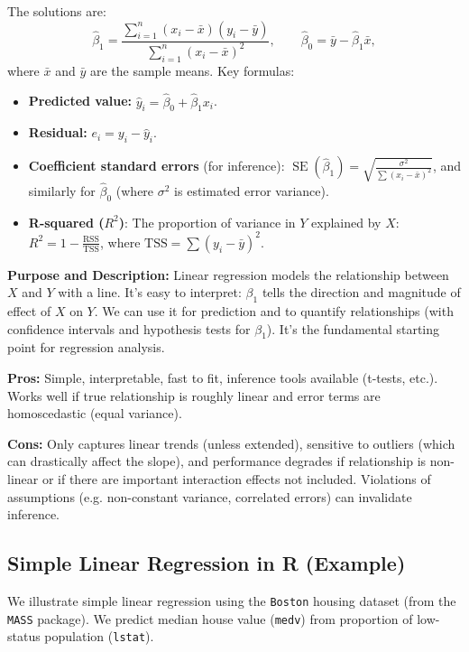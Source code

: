 \documentclass[11pt]{article}
\begin{document}
The solutions are:
\[ \hat\beta_1 = \frac{\sum_{i=1}^n (x_i - \bar{x})(y_i - \bar{y})}{\sum_{i=1}^n (x_i - \bar{x})^2}, \qquad 
\hat\beta_0 = \bar{y} - \hat\beta_1 \bar{x}, \] 
where $\bar{x}$ and $\bar{y}$ are the sample means. Key formulas:
\begin{itemize}
  \item \textbf{Predicted value:} $\hat{y}_i = \hat\beta_0 + \hat\beta_1 x_i$.
  \item \textbf{Residual:} $e_i = y_i - \hat{y}_i$.
  \item \textbf{Coefficient standard errors} (for inference): 
  $\operatorname{SE}(\hat\beta_1) = \sqrt{\frac{\sigma^2}{\sum (x_i-\bar{x})^2}}$, 
  and similarly for $\hat\beta_0$ (where $\sigma^2$ is estimated error variance).
  \item \textbf{R-squared ($R^2$)}: The proportion of variance in $Y$ explained by $X$: 
  $R^2 = 1 - \frac{\text{RSS}}{\text{TSS}}$, where $\text{TSS} = \sum (y_i-\bar{y})^2$.
\end{itemize}

\textbf{Purpose and Description:} Linear regression models the relationship between $X$ and $Y$ with a line. It's easy to interpret: $\beta_1$ tells the direction and magnitude of effect of $X$ on $Y$. We can use it for prediction and to quantify relationships (with confidence intervals and hypothesis tests for $\beta_1$). It's the fundamental starting point for regression analysis.

\textbf{Pros:} Simple, interpretable, fast to fit, inference tools available (t-tests, etc.). Works well if true relationship is roughly linear and error terms are homoscedastic (equal variance).

\textbf{Cons:} Only captures linear trends (unless extended), sensitive to outliers (which can drastically affect the slope), and performance degrades if relationship is non-linear or if there are important interaction effects not included. Violations of assumptions (e.g. non-constant variance, correlated errors) can invalidate inference.

\subsection{Simple Linear Regression in R (Example)}
We illustrate simple linear regression using the \texttt{Boston} housing dataset (from the \texttt{MASS} package). We predict median house value (\texttt{medv}) from proportion of low-status population (\texttt{lstat}). 
\end{document}

